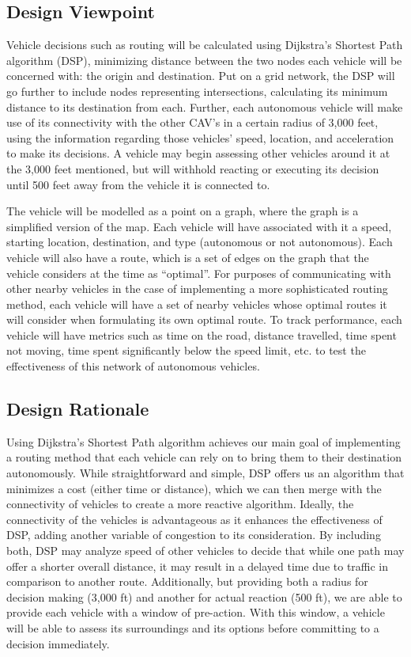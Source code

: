 \documentclass[onecolumn, draftclsnofoot,10pt, compsoc]{IEEEtran}
\begin{document}
\subsection{Design Viewpoint}
Vehicle decisions such as routing will be calculated using Dijkstra’s Shortest Path algorithm (DSP), minimizing distance between the two nodes each vehicle will be concerned with: the origin and destination.
Put on a grid network, the DSP will go further to include nodes representing intersections, calculating its minimum distance to its destination from each.
Further, each autonomous vehicle will make use of its connectivity with the other CAV’s in a certain radius of 3,000 feet, using the information regarding those vehicles’ speed, location, and acceleration to make its decisions.
A vehicle may begin assessing other vehicles around it at the 3,000 feet mentioned, but will withhold reacting or executing its decision until 500 feet away from the vehicle it is connected to.

The vehicle will be modelled as a point on a graph, where the graph is a simplified version of the map.
Each vehicle will have associated with it a speed, starting location, destination, and type (autonomous or not autonomous).
Each vehicle will also have a route, which is a set of edges on the graph that the vehicle considers at the time as “optimal”.
For purposes of communicating with other nearby vehicles in the case of implementing a more sophisticated routing method, each vehicle will have a set of nearby vehicles whose optimal routes it will consider when formulating its own optimal route.
To track performance, each vehicle will have metrics such as time on the road, distance travelled, time spent not moving, time spent significantly below the speed limit, etc. to test the effectiveness of this network of autonomous vehicles.
\subsection{Design Rationale}
Using Dijkstra’s Shortest Path algorithm achieves our main goal of implementing a routing method that each vehicle can rely on to bring them to their destination autonomously.
While straightforward and simple, DSP offers us an algorithm that minimizes a cost (either time or distance), which we can then merge with the connectivity of vehicles to create a more reactive algorithm.
Ideally, the connectivity of the vehicles is advantageous as it enhances the effectiveness of DSP, adding another variable of congestion to its consideration.
By including both, DSP may analyze speed of other vehicles to decide that while one path may offer a shorter overall distance, it may result in a delayed time due to traffic in comparison to another route.
Additionally, but providing both a radius for decision making (3,000 ft) and another for actual reaction (500 ft), we are able to provide each vehicle with a window of pre-action.
With this window, a vehicle will be able to assess its surroundings and its options before committing to a decision immediately.
\end{document}
